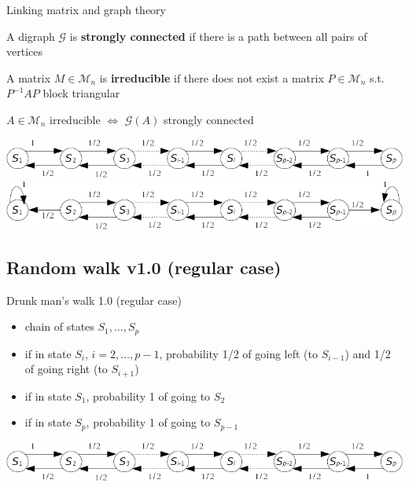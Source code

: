 \documentclass[aspectratio=169]{beamer}
\begin{document}
\begin{frame}{Linking matrix and graph theory}
\begin{definition}
    A digraph $\mathcal{G}$ is \textbf{strongly connected} if there is a path between all pairs of vertices
\end{definition}
\vfill
\begin{definition}
    A matrix $M\in\mathcal{M}_n$ is \textbf{irreducible} if there does not exist a matrix $P\in\mathcal{M}_n$ s.t. $P^{-1}AP$ block triangular 
\end{definition}
\vfill
\begin{theorem}
    $A\in\mathcal{M}_n$ irreducible $\iff$ $\mathcal{G}(A)$ strongly connected    
\end{theorem}

\begin{center}
    \includegraphics[width=\textwidth]{FIGS/drunk_mans_walk_regular}
    \includegraphics[width=\textwidth]{FIGS/drunk_mans_walk_absorbing}
\end{center}
\end{frame}


\subsection{Random walk v1.0 (regular case)}

\begin{frame}{Drunk man's walk 1.0 (regular case)}
    \begin{itemize}
        \item chain of states $S_1,\ldots,S_p$
        \item if in state $S_i$, $i=2,\ldots,p-1$, probability 1/2 of going left (to $S_{i-1}$) and 1/2 of going right (to $S_{i+1}$)
        \item if in state $S_1$, probability 1 of going to $S_2$
        \item if in state $S_p$, probability 1 of going to $S_{p-1}$
    \end{itemize}
\vfill
\begin{center}
    \includegraphics[width=\textwidth]{FIGS/drunk_mans_walk_regular}
\end{center}
\end{frame}
\end{document}
